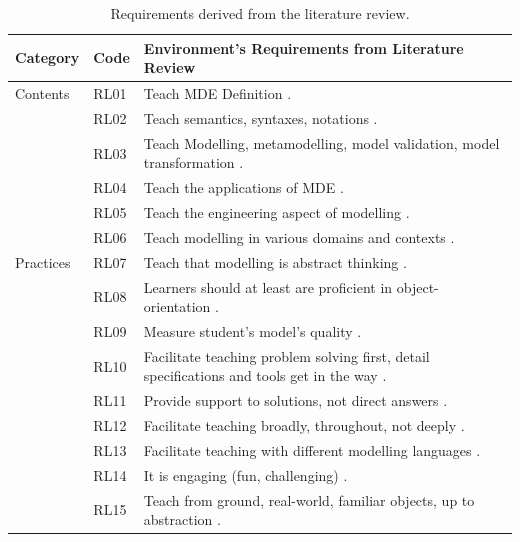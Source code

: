 \documentclass[10pt, a4paper]{report} \usepackage[titletoc]{appendix}
\begin{document}
\begin{table}[t!]\caption{Requirements derived from the literature review.}
\label{literature-review-1}
\begin{center}
\begin{tabular}{ p{1.6cm}p{1cm}p{10.4cm} } 
\hline
Category & Code & Environment's Requirements from Literature Review \\
\hline
\multirow{1}{2cm}{Contents} 
& RL01 & Teach MDE Definition \cite{borstler2012teaching}. \\ 
& RL02 & Teach semantics, syntaxes, notations \cite{borstler2012teaching}. \\ 
& RL03 & Teach Modelling, metamodelling, model validation, model transformation \cite{bezivin2009teaching, ober2007teaching}. \\
& RL04 & Teach the applications of MDE \cite{bezivin2009teaching, liebel2015ready}. \\
& RL05 & Teach the engineering aspect of modelling \cite{paige2014bad}.\\
& RL06 & Teach modelling in various domains and contexts \cite{borstler2012teaching, paige2014bad}.\\
\hline
\multirow{1}{2cm}{Practices} 
& RL07 & Teach that modelling is abstract thinking \cite{bezivin2009teaching}.\\
& RL08 & Learners should at least are proficient in object-orientation \cite{bezivin2009teaching, paige2014bad, Akayama2013}.\\
& RL09 & Measure student's model's quality \cite{Akayama2013}.\\
& RL10 & Facilitate teaching problem solving first, detail specifications and tools get in the way \cite{paige2014bad}. \\
& RL11 & Provide support to solutions, not direct answers \cite{paige2014bad}. \\ 
& RL12 & Facilitate teaching broadly, throughout, not deeply \cite{borstler2012teaching, paige2014bad, Akayama2013}.\\
& RL13 & Facilitate teaching with different modelling languages \cite{bezivin2009teaching, paige2014bad}.\\ 
& RL14 & It is engaging (fun, challenging) \cite{paige2014bad}.\\ 
& RL15 & Teach from ground, real-world, familiar objects, up to abstraction \cite{engels2005teaching}.\\ 


\end{tabular}
\end{center}
\end{table}
\end{document}
